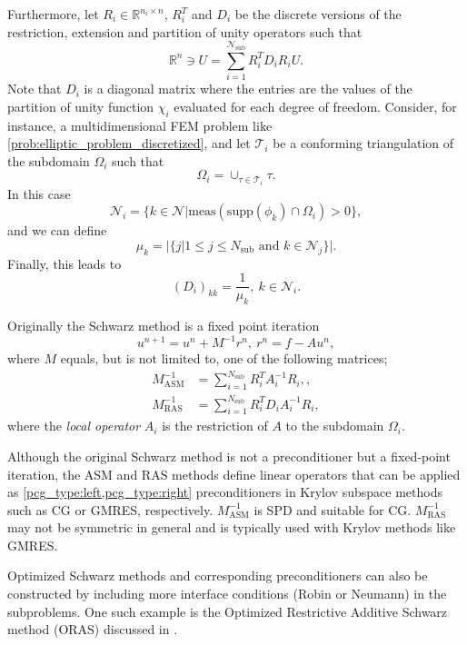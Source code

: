 Furthermore, let $R_i\in\mathbb{R}^{n_i \times n}$, $R_i^T$ and $D_i$ be the discrete versions of the restriction, extension and partition of unity operators such that
\[
  \mathbb{R}^{n}\ni U = \sum_{i=1}^{\mathcal{N}_{\text{sub}}} R_i^T D_i R_i U.
\]
Note that $D_i$ is a diagonal matrix where the entries are the values of the partition of unity function $\chi_i$ evaluated for each degree of freedom. Consider, for instance, a multidimensional FEM problem like \cref{prob:elliptic_problem_discretized}, and let $\mathcal{T}_i$ be a conforming triangulation of the subdomain $\Omega_i$ such that
\[
  \Omega_i = \cup_{\tau \in \mathcal{T}_i} \tau.
\]
In this case
\[
  \mathcal{N}_i = \{k\in\mathcal{N}| \text{meas}(\text{supp}(\phi_k)\cap\Omega_i)>0\},
\]
and we can define
\[
  \mu_k = |\{j| 1\leq j \leq N_{\text{sub}} \text{ and } k\in\mathcal{N}_j\}|.
\]
Finally, this leads to
\begin{equation}
  (D_i)_{kk} = \frac{1}{\mu_k}, \ k \in \mathcal{N}_i.
  \label{eq:schwarz_partition_of_unity_FEM}
\end{equation}

Originally the Schwarz method is a fixed point iteration \cite[Definitions 1.12 and 1.13]{schwarz_methods_Dolean_2015}
\[
  u^{n+1} = u^n + M^{-1}r^n, \ r^n = f - A u^n,
\]
where $M$ equals, but is not limited to, one of the following matrices;
\begin{subequations}
  \begin{align}
    M^{-1}_{\text{ASM}} & = \sum_{i=1}^{N_{\text{sub}}} R_i^T A_i^{-1} R_i, \label{eq:ASM_preconditioner},     \\
    M^{-1}_{\text{RAS}} & = \sum_{i=1}^{N_{\text{sub}}} R_i^T D_i A_i^{-1} R_i \label{eq:RAS_preconditioner},
  \end{align}
\end{subequations}
where the \textit{local operator} $A_i$ is the restriction of $A$ to the subdomain $\Omega_i$. 

Although the original Schwarz method is not a preconditioner but a fixed-point iteration, the ASM and RAS methods define linear operators that can be applied as \cref{pcg_type:left,pcg_type:right} preconditioners in Krylov subspace methods such as CG or GMRES, respectively. $M^{-1}_{\text{ASM}}$ is SPD and suitable for CG. $M^{-1}_{\text{RAS}}$ may not be symmetric in general and is typically used with Krylov methods like GMRES.

Optimized Schwarz methods and corresponding preconditioners can also be constructed by including more interface conditions (Robin or Neumann) in the subproblems. One such example is the Optimized Restrictive Additive Schwarz method (ORAS) discussed in \cite[Chapter 2]{schwarz_methods_Dolean_2015}.

